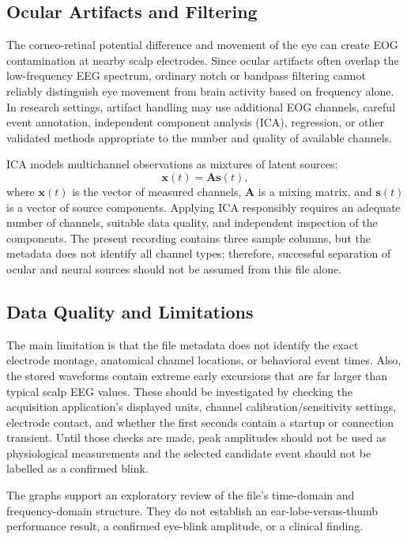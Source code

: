 \documentclass[12pt,a4paper]{article}
\begin{document}
\subsection{Ocular Artifacts and Filtering}
The corneo-retinal potential difference and movement of the eye can create EOG contamination at nearby scalp electrodes. Since ocular artifacts often overlap the low-frequency EEG spectrum, ordinary notch or bandpass filtering cannot reliably distinguish eye movement from brain activity based on frequency alone. In research settings, artifact handling may use additional EOG channels, careful event annotation, independent component analysis (ICA), regression, or other validated methods appropriate to the number and quality of available channels.

ICA models multichannel observations as mixtures of latent sources:
\begin{equation}
    \mathbf{x}(t)=\mathbf{A}\mathbf{s}(t),
    \label{eq:ica}
\end{equation}
where $\mathbf{x}(t)$ is the vector of measured channels, $\mathbf{A}$ is a mixing matrix, and $\mathbf{s}(t)$ is a vector of source components. Applying ICA responsibly requires an adequate number of channels, suitable data quality, and independent inspection of the components. The present recording contains three sample columns, but the metadata does not identify all channel types; therefore, successful separation of ocular and neural sources should not be assumed from this file alone.

\subsection{Data Quality and Limitations}
The main limitation is that the file metadata does not identify the exact electrode montage, anatomical channel locations, or behavioral event times. Also, the stored waveforms contain extreme early excursions that are far larger than typical scalp EEG values. These should be investigated by checking the acquisition application's displayed units, channel calibration/sensitivity settings, electrode contact, and whether the first seconds contain a startup or connection transient. Until those checks are made, peak amplitudes should not be used as physiological measurements and the selected candidate event should not be labelled as a confirmed blink.

The graphs support an exploratory review of the file's time-domain and frequency-domain structure. They do not establish an ear-lobe-versus-thumb performance result, a confirmed eye-blink amplitude, or a clinical finding.
\end{document}
